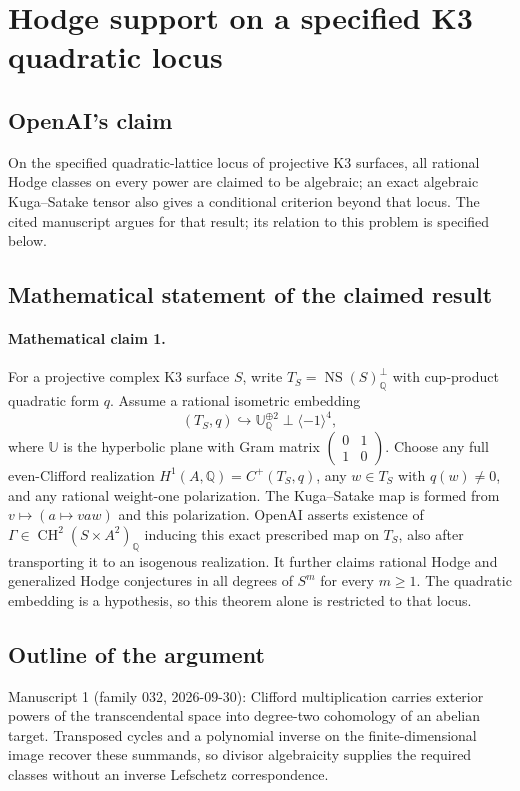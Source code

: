 \documentclass[11pt]{article}
\begin{document}
\section*{Hodge support on a specified K3 quadratic locus}

\subsection{OpenAI's claim}
On the specified quadratic-lattice locus of projective K3 surfaces, all rational Hodge classes on every power are claimed to be algebraic; an exact algebraic Kuga--Satake tensor also gives a conditional criterion beyond that locus. The cited manuscript argues for that result; its relation to this problem is specified below.

\subsection{Mathematical statement of the claimed result}
\paragraph{Mathematical claim 1.} For a projective complex K3 surface $S$, write $T_S=\operatorname{NS}(S)_{\mathbb Q}^{\perp}$ with cup-product quadratic form $q$. Assume a rational isometric embedding
\[
(T_S,q)\hookrightarrow\mathbb U_{\mathbb Q}^{\oplus2}\perp\langle-1\rangle^4,
\]
where $\mathbb U$ is the hyperbolic plane with Gram matrix $\left(\begin{smallmatrix}0&1\\1&0\end{smallmatrix}\right)$. Choose any full even-Clifford realization $H^1(A,\mathbb Q)=C^+(T_S,q)$, any $w\in T_S$ with $q(w)\ne0$, and any rational weight-one polarization. The Kuga--Satake map is formed from $v\mapsto(a\mapsto vaw)$ and this polarization. OpenAI asserts existence of $\Gamma\in\operatorname{CH}^2(S\times A^2)_{\mathbb Q}$ inducing this exact prescribed map on $T_S$, also after transporting it to an isogenous realization. It further claims rational Hodge and generalized Hodge conjectures in all degrees of $S^m$ for every $m\ge1$. The quadratic embedding is a hypothesis, so this theorem alone is restricted to that locus.

\subsection{Outline of the argument}
Manuscript 1 (family 032, 2026-09-30): Clifford multiplication carries exterior powers of the transcendental space into degree-two cohomology of an abelian target. Transposed cycles and a polynomial inverse on the finite-dimensional image recover these summands, so divisor algebraicity supplies the required classes without an inverse Lefschetz correspondence.
\end{document}
